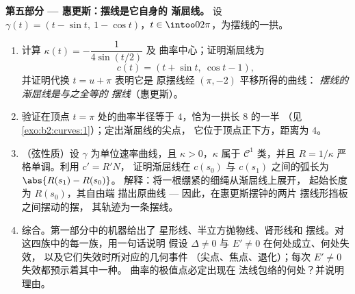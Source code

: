 \begin{problem}
\medskip
\noindent\textbf{第五部分 --- 惠更斯：摆线是它自身的
渐屈线。} 设 $\gamma(t) = (t - \sin t,\ 1 - \cos t)$，$t \in
\intoo0{2\pi}$，为摆线的一拱。
\begin{enumerate}[resume]
  \item 计算 $\kappa(t) = -\dfrac1{4\sin(t/2)}$ 及
        曲率中心；证明渐屈线为
        \[
        c(t) = (t + \sin t,\ \cos t - 1),
        \]
        并证明代换 $t = u + \pi$ 表明它是
        原摆线经 $(\pi, -2)$ 平移所得的曲线：
        \emph{摆线的渐屈线是与之全等的
        摆线}（惠更斯）。
  \item 验证在顶点 $t =
        \pi$ 处的曲率半径等于 $4$，恰为一拱长 $8$ 的一半
        （见\cref{exo:b2:curves:1}）；定出渐屈线的尖点，
        它位于顶点正下方，距离为 $4$。
  \item （弦性质）设 $\gamma$ 为单位速率曲线，且
        $\kappa > 0$，$\kappa$ 属于 $\mathcal C^1$ 类，并且
        $R = 1/\kappa$ 严格单调。利用 $c' = R'N$，
        证明渐屈线在
        $c(s_0)$ 与 $c(s_1)$ 之间的弧长为 $\abs{R(s_1) - R(s_0)}$。
        解释：将一根绷紧的细绳从渐屈线上展开，
        起始长度为 $R(s_0)$，其自由端
        描出原曲线 --- 因此，在惠更斯摆钟的两片
        摆线形挡板之间摆动的摆，
        其轨迹为一条摆线。
  \item 综合。第一部分中的机器给出了
        星形线、半立方抛物线、肾形线和
        摆线。对这四族中的每一族，用一句话说明
        假设 $\Delta \neq 0$ 与 $E' \neq 0$ 在何处成立、何处失效，
        以及它们失效时所对应的几何事件
        （尖点、焦点、退化）；每次 $E' \neq 0$ 失效都预示着其中一种。
        曲率的极值点必定出现在
        法线包络的何处？并说明理由。
\end{enumerate}
\end{problem}
